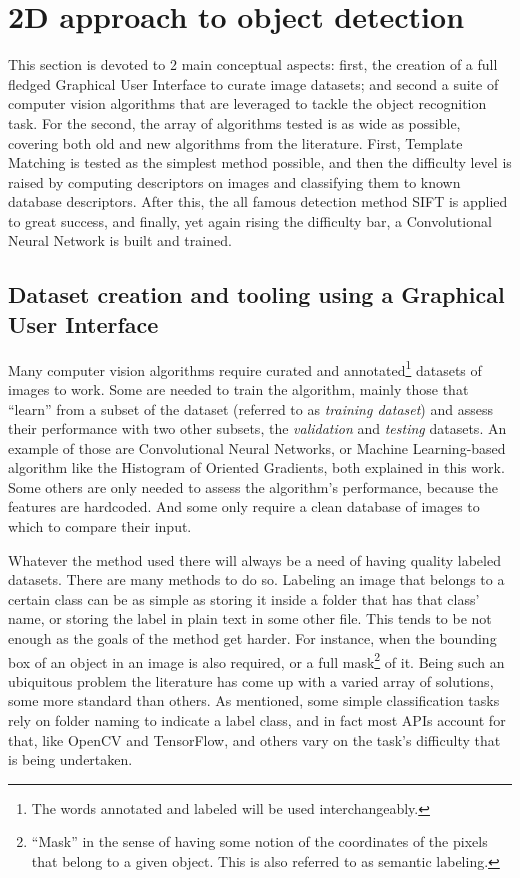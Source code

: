 \documentclass[../main.tex]{subfiles}
\begin{document}
\section{2D approach to object detection} \label{sec:2D_approach}
This section is devoted to 2 main conceptual aspects: first, the creation of a full fledged Graphical User Interface to curate image datasets; and second a suite of computer vision algorithms that are leveraged to tackle the object recognition task. For the second, the array of algorithms tested is as wide as possible, covering both old and new algorithms from the literature. First, Template Matching is tested as the simplest method possible, and then the difficulty level is raised by computing descriptors on images and classifying them to known database descriptors. After this, the all famous detection method SIFT is applied to great success, and finally, yet again rising the difficulty bar, a Convolutional Neural Network is built and trained.


\subsection{Dataset creation and tooling using a Graphical User Interface} \label{sec:GUI}
Many computer vision algorithms require curated and annotated\footnote{The words annotated and labeled will be used interchangeably.} datasets of images to work. Some are needed to train the algorithm, mainly those that ``learn'' from a subset of the dataset (referred to as \emph{training dataset}) and assess their performance with two other subsets, the \emph{validation} and \emph{testing} datasets. An example of those are Convolutional Neural Networks, or Machine Learning-based algorithm like the Histogram of Oriented Gradients, both explained in this work. Some others are only needed to assess the algorithm's performance, because the features are hardcoded. And some only require a clean database of images to which to compare their input.

Whatever the method used there will always be a need of having quality labeled datasets. There are many methods to do so. Labeling an image that belongs to a certain class can be as simple as storing it inside a folder that has that class' name, or storing the label in plain text in some other file. This tends to be not enough as the goals of the method get harder. For instance, when the bounding box of an object in an image is also required, or a full mask\footnote{``Mask'' in the sense of having some notion of the coordinates of the pixels that belong to a given object. This is also referred to as semantic labeling.} of it. Being such an ubiquitous problem the literature has come up with a varied array of solutions, some more standard than others. As mentioned, some simple classification tasks rely on folder naming to indicate a label class, and in fact most APIs account for that, like OpenCV and TensorFlow, and others vary on the task's difficulty that is being undertaken. 
\end{document}
